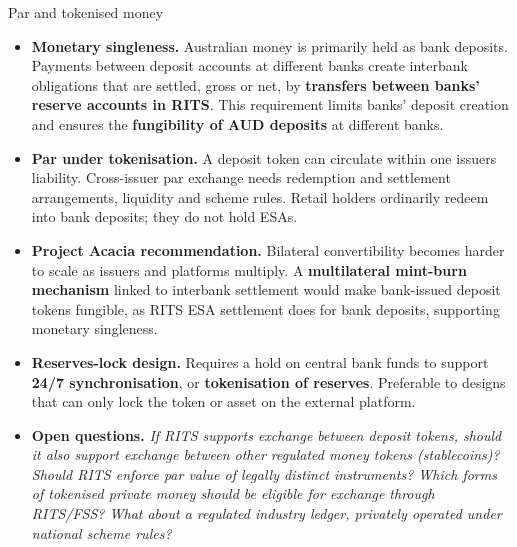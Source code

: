 \documentclass[aspectratio=169,12pt]{beamer}
\makeatletter
\newcommand{\rust}[1]{{\color{Rust}\bfseries\fontsize{\dimexpr\f@size pt+0.7pt\relax}{\f@baselineskip}\selectfont #1}}
\makeatother
\begin{document}




\begin{frame}[t]{Par and tokenised money}
\fontsize{8.0}{10.0}\selectfont
\vspace{-0.1em}
  \vspace{0pt plus 0.35fill}\begin{itemize}\setlength{\itemsep}{2pt plus 2.4fill}
    \item \rust{Monetary singleness.} Australian money is primarily held as bank deposits. Payments between deposit accounts at different banks create interbank obligations that are settled, gross or net, by \textbf{transfers between banks' reserve accounts in RITS}. This requirement limits banks' deposit creation and ensures the \textbf{fungibility of AUD deposits} at different banks.
    \item \rust{Par under tokenisation.} A deposit token can circulate within one issuer\textquotesingle s liability. Cross-issuer par exchange needs redemption and settlement arrangements, liquidity and scheme rules. Retail holders ordinarily redeem into bank deposits; they do not hold ESAs.
    \item \rust{Project Acacia recommendation.} Bilateral convertibility becomes harder to scale as issuers and platforms multiply. A \textbf{multilateral mint-burn mechanism} linked to interbank settlement would make bank-issued deposit tokens fungible, as RITS ESA settlement does for bank deposits, supporting monetary singleness.
    \item \rust{Reserves-lock design.} Requires a hold on central bank funds to support \textbf{24/7 synchronisation}, or \textbf{tokenisation of reserves}. Preferable to designs that can only lock the token or asset on the external platform.
    \item \rust{Open questions.} \textit{If RITS supports exchange between deposit tokens, should it also support exchange between other regulated money tokens (stablecoins)? Should RITS enforce par value of legally distinct instruments? Which forms of tokenised private money should be eligible for exchange through RITS/FSS? What about a regulated industry ledger, privately operated under national scheme rules?}
  \end{itemize}\vspace{0pt plus 4fill}
\end{frame}
\end{document}
